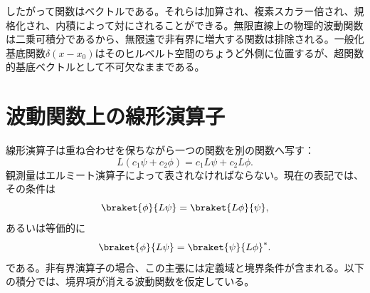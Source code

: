 したがって関数はベクトルである。それらは加算され、複素スカラー倍され、規格化され、内積によって対にされることができる。無限直線上の物理的波動関数は二乗可積分であるから、無限遠で非有界に増大する関数は排除される。一般化基底関数\(\delta(x-x_0)\)はそのヒルベルト空間のちょうど外側に位置するが、超関数的基底ベクトルとして不可欠なままである。

\begin{classroomqa}
\end{classroomqa}

\begin{classroomqa}
\end{classroomqa}

\begin{classroomqa}
\end{classroomqa}

\begin{classroomqa}
\end{classroomqa}

\section{波動関数上の線形演算子}

線形演算子は重ね合わせを保ちながら一つの関数を別の関数へ写す：
\begin{equation}
L(c_1\psi+c_2\phi)
=
c_1L\psi+c_2L\phi.
\end{equation}
観測量はエルミート演算子によって表されなければならない。現在の表記では、その条件は
\begin{equation}
\braket{\phi}{L\psi}
=
\braket{L\phi}{\psi},
\label{eq:l8-hermitian-condition}
\end{equation}
あるいは等価的に
\begin{equation}
\braket{\phi}{L\psi}
=
\braket{\psi}{L\phi}^*.
\end{equation}
である。非有界演算子の場合、この主張には定義域と境界条件が含まれる。以下の積分では、境界項が消える波動関数を仮定している。

